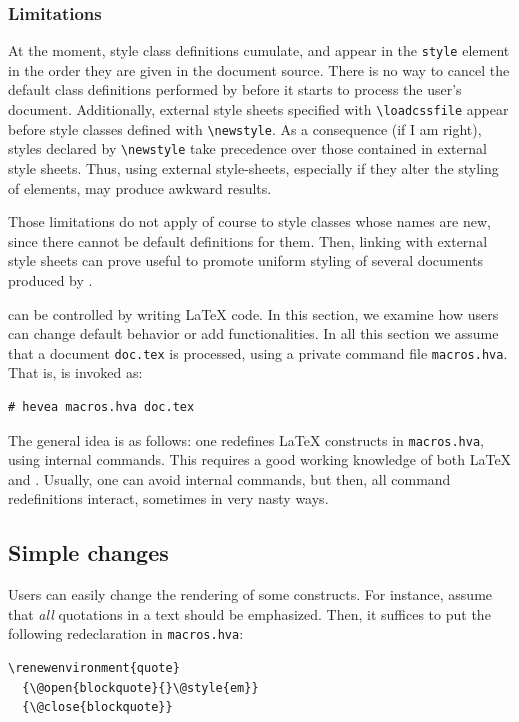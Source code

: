 \subsubsection{Limitations}
At the moment, style class definitions cumulate, and appear
in the \verb+style+ element in the order they are given in the
document source. There is no way to cancel the default class
definitions performed by \hevea{} before it starts to process the
user's document.
Additionally, external style sheets specified with \verb+\loadcssfile+
appear before style classes defined with \verb+\newstyle+.
As a consequence (if I am right), styles
declared by \verb+\newstyle+ take precedence over those contained in
external style sheets. Thus, using external style-sheets, especially
if they alter the styling of elements, may produce awkward results.

Those limitations do not apply of course to style classes whose
names are new, since there cannot be default definitions for them.
Then, linking with external style sheets can prove useful to
promote uniform styling of several documents produced by \hevea{}.


\hevea{} can be controlled by writing \LaTeX{} code. In this section,
we examine how users can change \hevea{} default behavior or add
functionalities. In all this section we assume that a document
\texttt{doc.tex} is processed, using a private command file
\texttt{macros.hva}. That is, \hevea{} is invoked as:
\begin{verbatim}
# hevea macros.hva doc.tex
\end{verbatim}
The general idea is as follows: one redefines \LaTeX{} constructs in
\texttt{macros.hva}, using internal commands. This requires a good
working knowledge of both \LaTeX{} and \html.
Usually, one can avoid internal commands, but then, all command
redefinitions interact, sometimes in very nasty ways.


\subsection{Simple changes}
Users can easily change the rendering of some constructs. For
instance, assume that \emph{all} quotations in a text should be
emphasized. Then, it suffices to put the following redeclaration in
\texttt{macros.hva}:
\begin{verbatim}
\renewenvironment{quote}
  {\@open{blockquote}{}\@style{em}}
  {\@close{blockquote}}
\end{verbatim}

